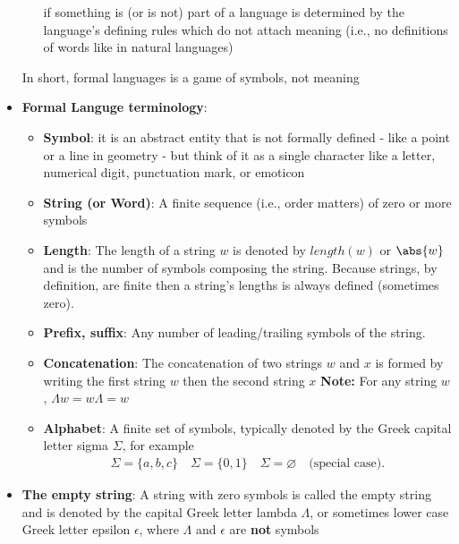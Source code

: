 \documentclass{report}
\begin{document}
\begin{itemize}
\begin{itemize}
                    if something is (or is not) part of a language is determined by the
                    language's defining rules which do not attach meaning (i.e., no
                    definitions of words like in natural languages)
            \end{itemize}
            In short, formal languages is a game of symbols, not meaning
        \item \textbf{Formal Languge terminology}:
            \begin{itemize}
                \item \textbf{Symbol}: it is an abstract entity that is not formally defined - like a point or a line in geometry - but think of it as a single character like a letter, numerical digit, punctuation mark, or emoticon
                \item \textbf{String (or Word)}: A finite sequence (i.e., order matters) of zero or more symbols
                \item \textbf{Length}: The length of a string $w$ is denoted by $length(w)$ or $\abs{w}$ and is the number of symbols composing the string. Because strings, by definition, are finite then a string's lengths is always defined (sometimes zero).
                \item \textbf{Prefix, suffix}: Any number of leading/trailing symbols of the string.
                \item \textbf{Concatenation}: The concatenation of two strings $w$ and $x$ is formed by writing the first string $w$ then the second string $x$
                    \bigbreak \noindent 
                    \textbf{Note:} For any string $w$, $\Lambda w = w\Lambda = w$  
                \item \textbf{Alphabet}: A finite set of symbols, typically denoted by the
                    Greek capital letter sigma $\Sigma$, for example
                    \begin{align*}
                        \Sigma = \{a,b,c\} \quad \Sigma = \{0,1\} \quad \Sigma = \varnothing \quad \text{(special case)}
                    .\end{align*}
            \end{itemize}
        \item \textbf{The empty string}:  A string with zero symbols is called the empty string
            and is denoted by the capital Greek letter lambda $\Lambda$, or sometimes
            lower case Greek letter epsilon $\epsilon$, where $\Lambda$ and $\epsilon$ are \textbf{not} symbols
            \bigbreak \noindent 

\end{itemize}
\end{document}
